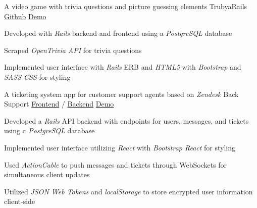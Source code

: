 \begin{cventries}
\cventry
    {A video game with trivia questions and picture guessing elements} %
    {TrubyaRails\vspace{-2.0mm}} %
    {\href{https://github.com/jhcheung/trubya-rails}{Github}\vspace{-2.0mm}} %
    {\href{https://trubya-rails.herokuapp.com/}{Demo}} %
    {
    \begin{cvitems} %
		\item {Developed with \textit{Rails} backend and frontend using a \textit{PostgreSQL} database}
		\item {Scraped \textit{OpenTrivia API} for trivia questions} 
		\item {Implemented user interface with \textit{Rails} ERB and \textit{HTML5} with \textit{Bootstrap} and \textit{SASS CSS} for styling}
    \end{cvitems}
}

  \cventry
    {A ticketing system app for customer support agents based on \textit{Zendesk}} %
    {Back Support\vspace{-2.0mm}} %
    {\href{https://github.com/jhcheung/backsupport-client}{Frontend} / \href{https://github.com/jhcheung/backsupport-backend}{Backend}\vspace{-2.0mm}} %
    {\href{https://backsupport-client.herokuapp.com/}{Demo}} %
    {
      \begin{cvitems} %
		\item {Developed a \textit{Rails} API backend with endpoints for users, messages, and tickets using a \textit{PostgreSQL} database}
		\item {Implemented user interface utilizing \textit{React} with \textit{Bootstrap React} for styling}
		\item {Used \textit{ActionCable} to push messages and tickets through WebSockets for simultaneous client updates}
        \item {Utilized \textit{JSON Web Tokens} and \textit{localStorage} to store encrypted user information client-side}      
    \end{cvitems}
    }



\end{cventries}

